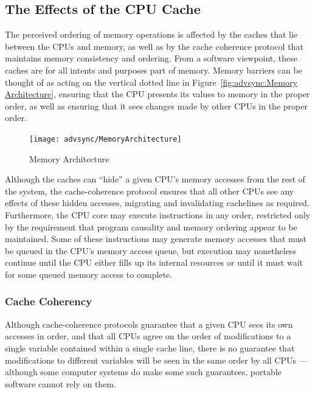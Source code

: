 \subsection{The Effects of the CPU Cache}
\label{sec:advsync:The Effects of the CPU Cache}

The perceived ordering of memory operations is affected by the caches
that lie between the CPUs and memory, as well as by the cache coherence
protocol that maintains memory consistency and ordering.
From a software viewpoint, these caches are for all intents and purposes
part of memory.
Memory barriers can be thought of as acting on the vertical dotted line in
Figure~\ref{fig:advsync:Memory Architecture}, ensuring that the CPU
presents its values to memory in the proper order, as well as ensuring
that it sees changes made by other CPUs in the proper order.

\begin{figure}[htb]
\begin{center}
\texttt{[image: advsync/MemoryArchitecture]}
\end{center}
\caption{Memory Architecture}
\end{figure}

Although the caches can ``hide'' a given CPU's memory accesses from the rest of
the system, the cache-coherence protocol ensures that all other CPUs see
any effects of these hidden accesses, migrating and invalidating cachelines
as required.
Furthermore, the CPU core may execute instructions in any order, restricted
only by the requirement that program causality and memory ordering
appear to be maintained.
Some of these instructions may generate memory accesses that must be queued
in the CPU's memory access queue, but execution may nonetheless continue
until the CPU either fills up its internal resources or until it must
wait for some queued memory access to complete.

\subsubsection{Cache Coherency}
\label{sec:advsync:Cache Coherency}

Although cache-coherence protocols guarantee that a given CPU sees its
own accesses in order, and that all CPUs agree on the order of modifications
to a single variable contained within a single cache line, there is no
guarantee that modifications to different variables will be seen in
the same order by all CPUs --- although some computer systems do make
some such guarantees, portable software cannot rely on them.

